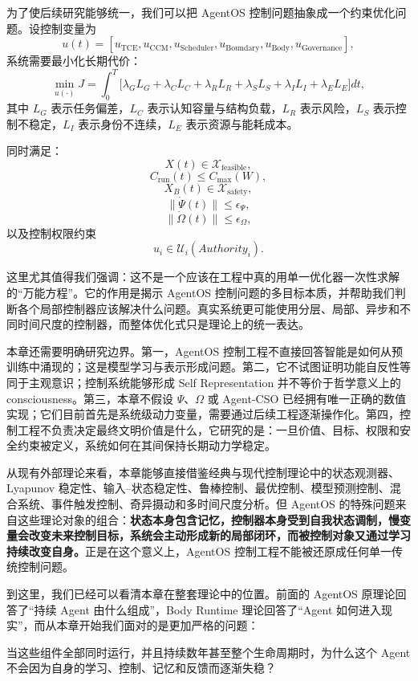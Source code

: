 为了使后续研究能够统一，我们可以把 AgentOS 控制问题抽象成一个约束优化问题。设控制变量为
\[
u(t)
=
[
u_{\mathrm{TCE}},
u_{\mathrm{CCM}},
u_{\mathrm{Scheduler}},
u_{\mathrm{Boundary}},
u_{\mathrm{Body}},
u_{\mathrm{Governance}}
],
\]
系统需要最小化长期代价：
\[
\min_{u(\cdot)}
J
=
\int_0^T
\Big[
\lambda_G L_G
+
\lambda_C L_C
+
\lambda_R L_R
+
\lambda_S L_S
+
\lambda_I L_I
+
\lambda_E L_E
\Big]dt,
\]
其中 $L_G$ 表示任务偏差，$L_C$ 表示认知容量与结构负载，$L_R$ 表示风险，$L_S$ 表示控制不稳定，$L_I$ 表示身份不连续，$L_E$ 表示资源与能耗成本。

同时满足：
\[
X(t)\in\mathcal X_{\mathrm{feasible}},
\]
\[
C_{\mathrm{run}}(t)
\le
C_{\max}(W),
\]
\[
X_B(t)\in\mathcal X_{\mathrm{safety}},
\]
\[
\|\dot\Psi(t)\|
\le
\epsilon_\Psi,
\]
\[
\|\dot\Omega(t)\|
\le
\epsilon_\Omega,
\]
以及控制权限约束
\[
u_i
\in
\mathcal U_i(
Authority_i
).
\]

这里尤其值得我们强调：这不是一个应该在工程中真的用单一优化器一次性求解的“万能方程”。它的作用是揭示 AgentOS 控制问题的多目标本质，并帮助我们判断各个局部控制器应该解决什么问题。真实系统更可能使用分层、局部、异步和不同时间尺度的控制器，而整体优化式只是理论上的统一表达。

本章还需要明确研究边界。第一，AgentOS 控制工程不直接回答智能是如何从预训练中涌现的；这是模型学习与表示形成问题。第二，它不试图证明功能自反性等同于主观意识；控制系统能够形成 Self Representation 并不等价于哲学意义上的 consciousness。第三，本章不假设 $\Psi$、$\Omega$ 或 Agent-CSO 已经拥有唯一正确的数值实现；它们目前首先是系统级动力变量，需要通过后续工程逐渐操作化。第四，控制工程不负责决定最终文明价值是什么，它研究的是：一旦价值、目标、权限和安全约束被定义，系统如何在其间保持长期动力学稳定。

从现有外部理论来看，本章能够直接借鉴经典与现代控制理论中的状态观测器、Lyapunov 稳定性、输入--状态稳定性、鲁棒控制、最优控制、模型预测控制、混合系统、事件触发控制、奇异摄动和多时间尺度分析。但 AgentOS 的特殊问题来自这些理论对象的组合：\textbf{状态本身包含记忆，控制器本身受到自我状态调制，慢变量会改变未来控制目标，系统会主动形成新的局部闭环，而被控制对象又通过学习持续改变自身。}正是在这个意义上，AgentOS 控制工程不能被还原成任何单一传统控制问题。

到这里，我们已经可以看清本章在整套理论中的位置。前面的 AgentOS 原理论回答了“持续 Agent 由什么组成”，Body Runtime 理论回答了“Agent 如何进入现实”，而从本章开始我们面对的是更加严格的问题：

\begin{statementbox}
当这些组件全部同时运行，并且持续数年甚至整个生命周期时，为什么这个 Agent 不会因为自身的学习、控制、记忆和反馈而逐渐失稳？
\end{statementbox}

